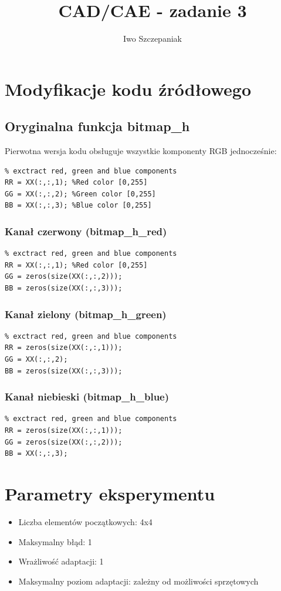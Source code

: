 \documentclass{article}
\title{CAD/CAE - zadanie 3}
\author{Iwo Szczepaniak}
\begin{document}
\maketitle

\section{Modyfikacje kodu źródłowego}

\subsection{Oryginalna funkcja bitmap\_h}
Pierwotna wersja kodu obsługuje wszystkie komponenty RGB jednocześnie:

\begin{verbatim}
% exctract red, green and blue components
RR = XX(:,:,1); %Red color [0,255]
GG = XX(:,:,2); %Green color [0,255]
BB = XX(:,:,3); %Blue color [0,255]
\end{verbatim}

\subsubsection{Kanał czerwony (bitmap\_h\_red)}
\begin{verbatim}
% exctract red, green and blue components
RR = XX(:,:,1); %Red color [0,255]
GG = zeros(size(XX(:,:,2)));
BB = zeros(size(XX(:,:,3)));
\end{verbatim}

\subsubsection{Kanał zielony (bitmap\_h\_green)}
\begin{verbatim}
% exctract red, green and blue components
RR = zeros(size(XX(:,:,1)));
GG = XX(:,:,2); 
BB = zeros(size(XX(:,:,3)));
\end{verbatim}

\subsubsection{Kanał niebieski (bitmap\_h\_blue)}
\begin{verbatim}
% exctract red, green and blue components
RR = zeros(size(XX(:,:,1)));
GG = zeros(size(XX(:,:,2)));
BB = XX(:,:,3);
\end{verbatim}

\section{Parametry eksperymentu}
\begin{itemize}
    \item Liczba elementów początkowych: 4x4
    \item Maksymalny błąd: 1
    \item Wrażliwość adaptacji: 1
    \item Maksymalny poziom adaptacji: zależny od możliwości sprzętowych
\end{itemize}
\end{document}
